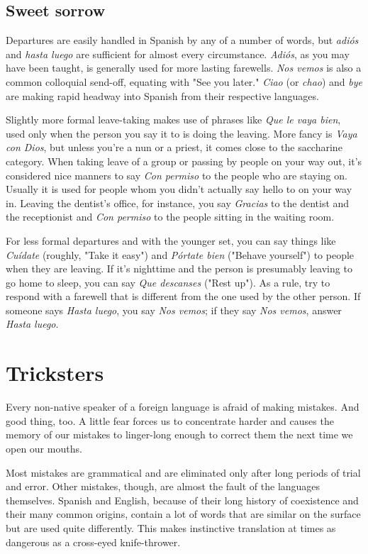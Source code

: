 \documentclass[14pt,a4paper,oneside]{memoir}
\begin{document}
\section{Sweet sorrow}

Departures are easily handled in Spanish by any of a number
of words, but \emph{adiós} and \emph{hasta luego} are sufficient for almost every circumstance. \emph{Adiós}, as you may have been taught, is generally used for
more lasting farewells. \emph{Nos vemos} is also a common colloquial send-off, equating with "See you later." \emph{Ciao} (or \emph{chao}) and \emph{bye} are making
rapid headway into Spanish from their respective languages.

Slightly more formal leave-taking makes use of phrases like
\emph{Que le vaya bien}, used only when the person you say it to is doing the
leaving. More fancy is \emph{Vaya con Dios}, but unless you're a nun or a
priest, it comes close to the saccharine category. When taking leave of
a group or passing by people on your way out, it's considered nice
manners to say \emph{Con permiso} to the people who are staying on. Usually it is
used for people whom you didn't actually say hello to on your way in.
Leaving the dentist's office, for instance, you say \emph{Gracias} to the dentist
and the receptionist and \emph{Con permiso} to the people sitting in the waiting room.

For less formal departures and with the younger set, you can
say things like \emph{Cuídate} (roughly, "Take it easy") and \emph{Pórtate bien} ("Behave yourself") to people when they are leaving. If it's nighttime and
the person is presumably leaving to go home to sleep, you can say \emph{Que
	descanses} ("Rest up"). As a rule, try to respond with a farewell that is
different from the one used by the other person. If someone says \emph{Hasta
	luego}, you say \emph{Nos vemos}; if they say \emph{Nos vemos}, answer \emph{Hasta luego}.

\chapter{Tricksters}

Every non-native speaker of a foreign language is afraid of
making mistakes. And good thing, too. A little fear forces us to concentrate harder and causes the memory of our mistakes to linger-long
enough to correct them the next time we open our mouths.

Most mistakes are grammatical and are eliminated only after
long periods of trial and error. Other mistakes, though, are almost the
fault of the languages themselves. Spanish and English, because of
their long history of coexistence and their many common origins, contain a lot of words that are similar on the surface but are used quite
differently. This makes instinctive translation at times as dangerous as
a cross-eyed knife-thrower.
\end{document}
